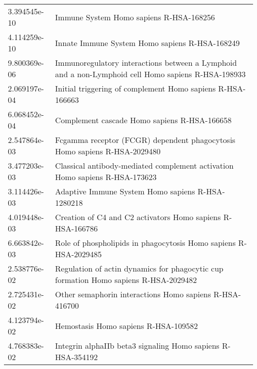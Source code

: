 \begin{longtable}{p{2.4cm}p{14.5cm}}
\bottomrule
\endlastfoot
             3.394545e-10 &                                                             Immune System Homo sapiens R-HSA-168256 \\
             4.114259e-10 &                                                      Innate Immune System Homo sapiens R-HSA-168249 \\
             9.800369e-06 &  Immunoregulatory interactions between a Lymphoid and a non-Lymphoid cell Homo sapiens R-HSA-198933 \\
             2.069197e-04 &                                          Initial triggering of complement Homo sapiens R-HSA-166663 \\
             6.068452e-04 &                                                        Complement cascade Homo sapiens R-HSA-166658 \\
             2.547864e-03 &                           Fcgamma receptor (FCGR) dependent phagocytosis Homo sapiens R-HSA-2029480 \\
             3.477203e-03 &                         Classical antibody-mediated complement activation Homo sapiens R-HSA-173623 \\
             3.114426e-03 &                                                   Adaptive Immune System Homo sapiens R-HSA-1280218 \\
             4.019448e-03 &                                          Creation of C4 and C2 activators Homo sapiens R-HSA-166786 \\
             6.663842e-03 &                                    Role of phospholipids in phagocytosis Homo sapiens R-HSA-2029485 \\
             2.538776e-02 &                Regulation of actin dynamics for phagocytic cup formation Homo sapiens R-HSA-2029482 \\
             2.725431e-02 &                                             Other semaphorin interactions Homo sapiens R-HSA-416700 \\
             4.123794e-02 &                                                                Hemostasis Homo sapiens R-HSA-109582 \\
             4.768383e-02 &                                         Integrin alphaIIb beta3 signaling Homo sapiens R-HSA-354192 \\
\end{longtable}


